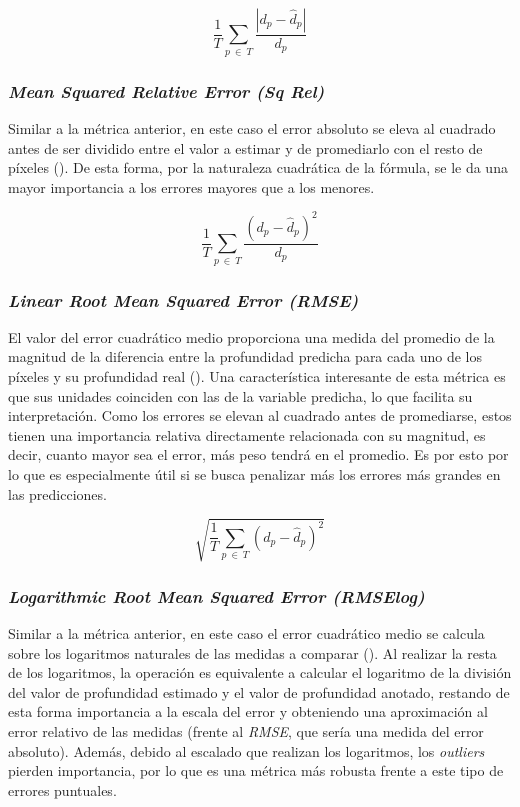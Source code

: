 \begin{equation}
\label{eqn:abs_rel}
\frac{1}{T}\sum_{p\ \in\ T} \frac{|d_p - \hat{d}_p|}{d_p}
\end{equation}

\subsubsection{\textit{Mean Squared Relative Error (Sq Rel)}}
Similar a la métrica anterior, en este caso el error absoluto se eleva al cuadrado antes de ser dividido entre el valor a estimar y de promediarlo con el resto de píxeles (). De esta forma, por la naturaleza cuadrática de la fórmula, se le da una mayor importancia a los errores mayores que a los menores.

\begin{equation}
\label{eqn:sq_rel}
\frac{1}{T}\sum_{p\ \in\ T} \frac{(d_p - \hat{d}_p)^2}{d_p}
\end{equation}

\subsubsection{\textit{Linear Root Mean Squared Error (RMSE)}}
El valor del error cuadrático medio proporciona una medida del promedio de la magnitud de la diferencia entre la profundidad predicha para cada uno de los píxeles y su profundidad real (). Una característica interesante de esta métrica es que sus unidades coinciden con las de la variable predicha, lo que facilita su interpretación. Como los errores se elevan al cuadrado antes de promediarse, estos tienen una importancia relativa directamente relacionada con su magnitud, es decir, cuanto mayor sea el error, más peso tendrá en el promedio. Es por esto por lo que es especialmente útil si se busca penalizar más los errores más grandes en las predicciones.

\begin{equation}
\label{eqn:rmse}
\sqrt{\frac{1}{T}\sum_{p\ \in\ T} (d_p - \hat{d}_p)^2}
\end{equation}

\subsubsection{\textit{Logarithmic Root Mean Squared Error (RMSElog)}}
Similar a la métrica anterior, en este caso el error cuadrático medio se calcula sobre los logaritmos naturales de las medidas a comparar (). Al realizar la resta de los logaritmos, la operación es equivalente a calcular el logaritmo de la división del valor de profundidad estimado y el valor de profundidad anotado, restando de esta forma importancia a la escala del error y obteniendo una aproximación al error relativo de las medidas (frente al \textit{RMSE}, que sería una medida del error absoluto). Además, debido al escalado que realizan los logaritmos, los \textit{outliers} pierden importancia, por lo que es una métrica más robusta frente a este tipo de errores puntuales.

